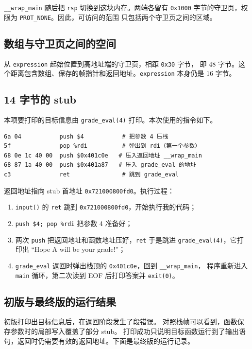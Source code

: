 \documentclass[UTF8,a4paper,12pt,fontset=windows]{ctexart}
\newcommand{\code}[1]{\texttt{#1}}
\begin{document}
\code{\_\_wrap\_main} 随后把 \code{rsp} 切换到这块内存。两端各留有
\code{0x1000} 字节的守卫页，权限为 \code{PROT\_NONE}。因此，可访问的范围
只包括两个守卫页之间的区域。

\subsection{数组与守卫页之间的空间}

从 \code{expression} 起始位置到高地址端的守卫页，相距 \code{0x30} 字节，
即 48 字节。这个距离包含数组、保存的帧指针和返回地址。\code{expression} 本身仍是 16 字节。

\subsection{14 字节的 stub}

本项要打印的目标信息由 \code{grade\_eval(4)} 打印。本次使用的指令如下。

\begin{lstlisting}
6a 04           push $4           # 把参数 4 压栈
5f              pop %rdi          # 弹出到 rdi（第一个参数）
68 0e 1c 40 00  push $0x401c0e   # 压入返回地址 __wrap_main
68 87 1a 40 00  push $0x401a87   # 压入 grade_eval 的地址
c3              ret               # 跳到 grade_eval
\end{lstlisting}

返回地址指向 stub 首地址 \code{0x721000800fd0}。执行过程：

\begin{enumerate}
  \item \code{input()} 的 \code{ret} 跳到 \code{0x721000800fd0}，开始执行我的代码；
  \item \code{push \$4; pop \%rdi} 把参数 4 准备好；
  \item 两次 \code{push} 把返回地址和函数地址压好，\code{ret} 于是跳进
        \code{grade\_eval(4)}，它打印出 “Hope A will be your grade!”；
  \item \code{grade\_eval} 返回时弹出栈顶的 \code{0x401c0e}，回到 \code{\_\_wrap\_main}，
        程序重新进入 \code{main} 循环，第二次读到 EOF 后打印答案并 \code{exit(0)}。
\end{enumerate}

\subsection{初版与最终版的运行结果}

初版打印出目标信息后，在返回阶段发生了段错误。
对照栈帧可以看到，函数保存参数时的局部写入覆盖了部分 stub。
打印成功只说明目标函数运行到了输出语句，返回时仍需要有效的返回地址。下面是最终版的运行记录。
\end{document}
